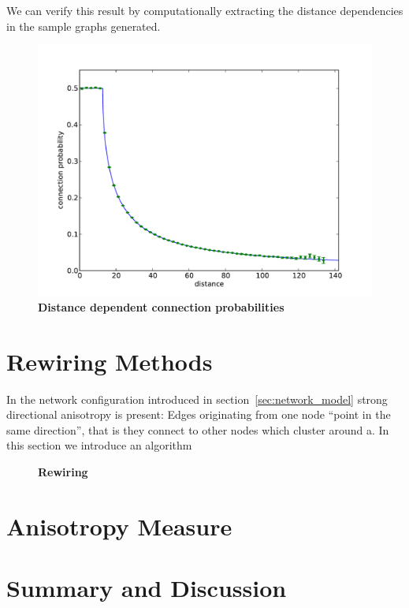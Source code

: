 We can verify this result by computationally extracting the distance
dependencies in the sample graphs generated. 

\begin{figure}[h]
  \centering
  \includegraphics[width=0.7\linewidth]{gfx/plots/test.pdf}
  \caption{\textbf{Distance dependent connection probabilities}}%
  \label{fig:something_else}%
\end{figure}





\section{Rewiring Methods}

In the network configuration introduced in
section~\ref{sec:network_model} strong directional anisotropy is
present: Edges originating from one node \enquote{point in the same
  direction}, that is they connect to other nodes which cluster around
a. In this section we introduce an algorithm

\vspace{0.5cm}
\begin{figure}[h] 
  \centering 
  \caption{\textbf{Rewiring}}%
  \label{fig:distance_rewiring}
\end{figure}

 

\section{Anisotropy Measure}


\section{Summary and Discussion}













